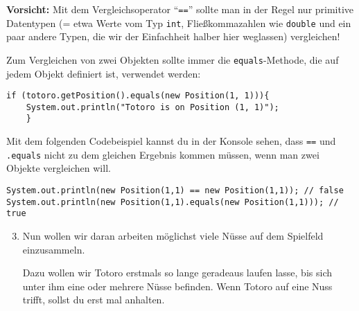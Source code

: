 \begin{Infobox}[\lstinline{==} und die \lstinline{equals()}-Methode]
	\textbf{Vorsicht:} Mit dem Vergleichsoperator \enquote{\lstinline{==}} sollte man in der Regel nur primitive Datentypen (= etwa Werte vom Typ \lstinline{int}, Fließkommazahlen wie \lstinline{double} und ein paar andere Typen, die wir der Einfachheit halber hier weglassen) vergleichen!\newline

	Zum Vergleichen von zwei Objekten sollte immer die \lstinline{equals}-Methode, die auf jedem Objekt definiert ist, verwendet werden:
	
	\begin{lstlisting}[numbers=none]
	if (totoro.getPosition().equals(new Position(1, 1))){
	System.out.println("Totoro is on Position (1, 1)");
	}
	\end{lstlisting}
	
	Mit dem folgenden Codebeispiel kannst du in der Konsole sehen, dass \lstinline{==} und \lstinline{.equals} nicht zu dem gleichen Ergebnis kommen müssen, wenn man zwei Objekte vergleichen will.

	\begin{lstlisting}[numbers=none]
System.out.println(new Position(1,1) == new Position(1,1)); // false
System.out.println(new Position(1,1).equals(new Position(1,1))); // true
	\end{lstlisting}

\end{Infobox}


\begin{enumerate}\setcounter{enumi}{2}
	\item
	 	Nun wollen wir daran arbeiten möglichst viele Nüsse auf dem Spielfeld einzusammeln.

		Dazu wollen wir Totoro erstmals so lange geradeaus laufen lasse, bis sich unter ihm eine oder mehrere Nüsse befinden.
		Wenn Totoro auf eine Nuss trifft, sollst du erst mal anhalten.
\end{enumerate}


